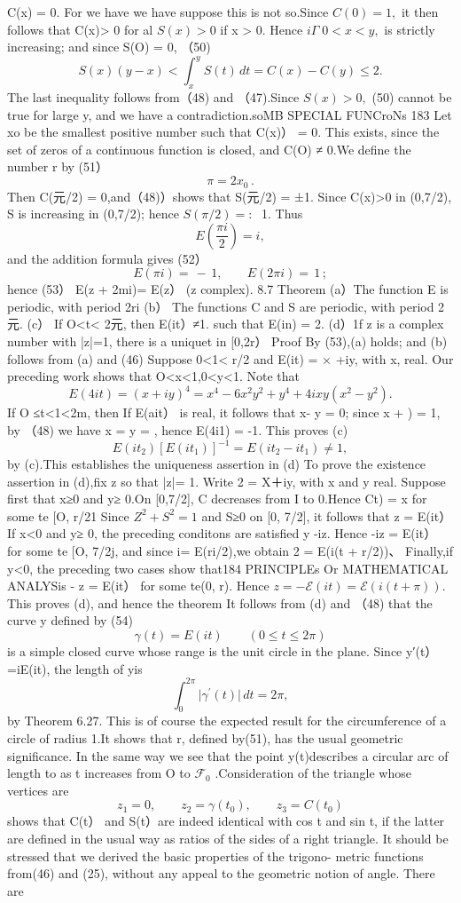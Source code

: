 C(x) = 0. For we have we have suppose this is not so.Since $C(0)=1,$ it then follows that C(x)> 0 for al $S(x)>0$ if x > 0. Hence $i\Gamma\;0<x<y,$ is strictly increasing; and since S(O) = 0, （50) $$ S(x)(y-x)<\int_{x}^{y}\!S(t)\,d t=C(x)-C(y)\leq2. $$ The last inequality follows from（48) and （47).Since $S(x)>0,$ (50) cannot be true for large y, and we have a contradiction.soMB SPECIAL FUNCroNs 183 Let xo be the smallest positive number such that C(x)） = 0. This exists, since the set of zeros of a continuous function is closed, and C(O) ≠ 0.We define the number r by (51） $$ \pi=2x_{0}\,. $$ Then C(元/2) = 0,and（48)）shows that S(元/2) = ±1. Since C(x)>0 in (0,7/2), S is increasing in (0,7/2); hence $S(\pi/2)=:\;$ 1. Thus $$ E\left(\frac{\pi i}{2}\right)=i, $$ and the addition formula gives (52） $$ E(\pi i)=\,-\,1,\;\;\;\;\;\;\;E(2\pi i)=\,1\,; $$ hence (53） E(z + 2mi)= E(z） (z complex). 8.7 Theorem (a）The function E is periodic, with period 2ri (b） The functions C and S are periodic, with period 2元. (c） If O<t< 2元, then E(it）≠1. such that E(in) = 2. (d）1f z is a complex number with |z|=1, there is a uniquet in [0,2r） Proof By (53),(a) holds; and (b) follows from (a) and (46) Suppose 0<1< r/2 and E(it) = × +iy, with x, real. Our preceding work shows that O<x<1,0<y<1. Note that $$ E(4i t)=(x+i y)^{4}=x^{4}-6x^{2}y^{2}+y^{4}+4i x y(x^{2}-y^{2}). $$ If O ≤t<1<2m, then If E(ait） is real, it follows that x- y = 0; since x + ) = 1, by （48) we have x = y = , hence E(4i1) = -1. This proves (c) $$ E(i t_{2})[E(i t_{1})]^{-1}=E(i t_{2}-i t_{1})\neq1, $$ by (c).This establishes the uniqueness assertion in (d) To prove the existence assertion in (d),fix z so that |z|= 1. Write 2 = X＋iy, with x and y real. Suppose first that x≥0 and y≥ 0.On [0,7/2], C decreases from I to 0.Hence Ct) = x for some te [O, r/21 Since $Z^{2}+S^{2}=1$ and S≥0 on [0, 7/2], it follows that z = E(it） If x<0 and y≥ 0, the preceding conditons are satisfied y -iz. Hence -iz = E(it） for some te [O, 7/2j, and since i= E(ri/2),we obtain 2 = E(i(t + r/2))、 Finally,if y<0, the preceding two cases show that184 PRINCIPLEs Or MATHEMATICAL ANALYSis - z = E(it） for some te(0, r). Hence $z=-\mathcal{E}(i t)=\mathcal{E}(i(t+\pi)).$ This proves (d), and hence the theorem It follows from (d) and （48) that the curve y defined by (54) $$ \gamma(t)=E(i t)\qquad(0\leq t\leq2\pi) $$ is a simple closed curve whose range is the unit circle in the plane. Since y′(t）=iE(it), the length of yis $$ \int_{0}^{2\pi}\vert\gamma^{\prime}(t)\vert\,d t=2\pi, $$ by Theorem 6.27. This is of course the expected result for the circumference of a circle of radius 1.It shows that r, defined by(51), has the usual geometric significance. In the same way we see that the point y(t)describes a circular arc of length to as t increases from O to ${\mathcal{F}}_{0}$ .Consideration of the triangle whose vertices are $$ z_{1}=0,\qquad z_{2}=\gamma(t_{0}),\qquad z_{3}=C(t_{0}) $$ shows that C(t） and S(t）are indeed identical with cos t and sin t, if the latter are defined in the usual way as ratios of the sides of a right triangle. It should be stressed that we derived the basic properties of the trigono- metric functions from(46) and (25), without any appeal to the geometric notion of angle. There are 